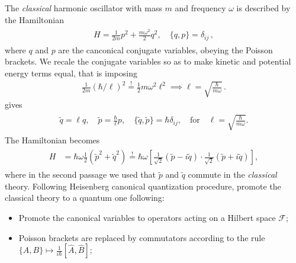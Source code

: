 \documentclass[../QFT_main.tex]{subfiles}
\begin{document}
\begin{mytheorem}
%
The \emph{classical} harmonic oscillator with mass $m$ and frequency $\omega$ is described by the Hamiltonian
{\small\begin{align}\label{eq:classical_harmonic_oscillator_hamiltonian}
\begin{aligned}
    H = \tfrac{1}{2m}p^2 + \tfrac{m\omega^2}{2} q^2, \quad \{q, p\} = \delta_{ij}\,,
\end{aligned}\end{align}}
where $q$ and $p$ are the canconical conjugate variables, obeying the Poisson brackets.
%
We recale the conjugate variables so as to make kinetic and potential energy terms equal, that is imposing
{\small\begin{align}
    \tfrac{1}{2m}(\hbar/\ell)^2\overset{!}{=} \tfrac{1}{2} m\omega^2\ell^2\implies \ell=\sqrt{\tfrac{\hbar}{m \omega}}\,.
\end{align}}
gives
{\small\begin{align}\label{eq:adimensional_harmonic_oscillator_variables}
\begin{aligned}
    \tilde{q}=\ell q, \quad \tilde{p}= \tfrac{\hbar}{\ell} p, \quad \{\tilde{q}, \tilde{p}\} = \hbar \delta_{ij},
     \quad \text{for}\quad \ell= \sqrt{\tfrac{\hbar}{m\omega}}.
\end{aligned}\end{align}}
The Hamiltonian becomes
{\small\begin{align}\label{eq:classical_harmonic_oscillator_factorization}
\begin{aligned}
    H &= \hbar \omega \tfrac{1}{2}\left( {\tilde{p}}^2 + {\tilde{q}}^2 \right)
    \overset{!}{=}\hbar \omega \left[
        \tfrac{1}{\sqrt{2}}\left( \tilde{p} - i \tilde{q} \right)
        \cdot \tfrac{1}{\sqrt{2}}\left( \tilde{p} + i \tilde{q} \right)
    \right],
\end{aligned}\end{align}}
where in the second passage we used that $\tilde{p}$ and $\tilde{q}$ commute in the \emph{classical} theory.
%
Following Heisenberg canonical quantization procedure, promote the classical theory to a quantum one following:
\begin{itemize}
    \item Promote the canonical variables to operators acting on a Hilbert space $\mathcal{F}$;
    \item Poisson brackets are replaced by commutators according to the rule $\displaystyle \{A, B\} \mapsto \tfrac{1}{i\hbar} [\hat{A}, \hat{B}]$;

\end{itemize}
\end{mytheorem}
\end{document}
